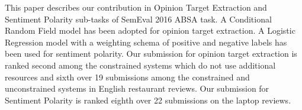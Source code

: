 This paper describes our contribution in Opinion Target Extraction  and Sentiment Polarity sub-tasks of SemEval 2016 ABSA task. A Conditional Random Field model  has been adopted for opinion target extraction.  A Logistic Regression model with a weighting schema of positive and negative labels has been used for sentiment polarity.  Our submission for opinion target extraction is ranked second among the constrained systems which do not use additional resources and  sixth over 19 submissions among the constrained and unconstrained systems in English restaurant reviews. Our submission for Sentiment Polarity is ranked eighth over 22 submissions on the laptop reviews.
